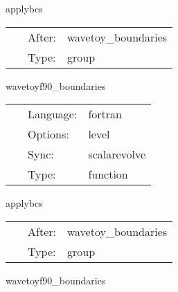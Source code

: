 \hspace{5mm} applybcs 

\hspace{5mm}{\it apply boundary conditions } 


\hspace{5mm}

 \begin{tabular*}{160mm}{cll} 
~ & After:  & wavetoy\_boundaries \\ 
~ & Type:  & group \\ 
\end{tabular*} 


\vspace{5mm}


\hspace{5mm} wavetoyf90\_boundaries 

\hspace{5mm}{\it boundaries of 3d wave equation } 


\hspace{5mm}

 \begin{tabular*}{160mm}{cll} 
~ & Language:  & fortran \\ 
~ & Options:  & level \\ 
~ & Sync:  & scalarevolve \\ 
~ & Type:  & function \\ 
\end{tabular*} 


\vspace{5mm}


\hspace{5mm} applybcs 

\hspace{5mm}{\it apply boundary conditions } 


\hspace{5mm}

 \begin{tabular*}{160mm}{cll} 
~ & After:  & wavetoy\_boundaries \\ 
~ & Type:  & group \\ 
\end{tabular*} 


\vspace{5mm}


\hspace{5mm} wavetoyf90\_boundaries 

